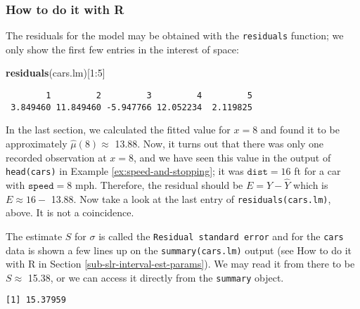 \documentclass[]{book}
\newenvironment{Shaded}{\begin{snugshade}}{\end{snugshade}}
\newcommand{\KeywordTok}[1]{\textcolor[rgb]{0.13,0.29,0.53}{\textbf{{#1}}}}
\newcommand{\DecValTok}[1]{\textcolor[rgb]{0.00,0.00,0.81}{{#1}}}
\newcommand{\StringTok}[1]{\textcolor[rgb]{0.31,0.60,0.02}{{#1}}}
\newcommand{\NormalTok}[1]{{#1}}
\numberwithin{equation}{chapter}
\numberwithin{figure}{chapter}
\theoremstyle{plain}
\theoremstyle{definition}
\theoremstyle{remark}
\theoremstyle{definition}
\theoremstyle{definition}
\theoremstyle{remark}
\begin{document}
\subsubsection{How to do it with R}\label{how-to-do-it-with-r-41}

The residuals for the model may be obtained with the \texttt{residuals}
function; we only show the first few entries in the interest of space:

\begin{Shaded}
\begin{Highlighting}[]
\KeywordTok{residuals}\NormalTok{(cars.lm)[}\DecValTok{1}\NormalTok{:}\DecValTok{5}\NormalTok{]}
\end{Highlighting}
\end{Shaded}

\begin{verbatim}
        1         2         3         4         5 
 3.849460 11.849460 -5.947766 12.052234  2.119825 
\end{verbatim}

In the last section, we calculated the fitted value for \(x=8\) and
found it to be approximately \(\hat{\mu}(8) \approx\) 13.88. Now, it
turns out that there was only one recorded observation at \(x = 8\), and
we have seen this value in the output of \texttt{head(cars)} in Example
\ref{ex:speed-and-stopping}; it was \(\mathtt{dist} = 16\) ft for a car
with \(\mathtt{speed} = 8\) mph. Therefore, the residual should be
\(E = Y - \hat{Y}\) which is \(E \approx 16 -\) 13.88. Now take a look
at the last entry of \texttt{residuals(cars.lm)}, above. It is not a
coincidence.

The estimate \(S\) for \(\sigma\) is called the
\texttt{Residual\ standard\ error} and for the \texttt{cars} data is
shown a few lines up on the \texttt{summary(cars.lm)} output (see How to
do it with R in Section \ref{sub-slr-interval-est-params}). We may read
it from there to be \(S\approx\) 15.38, or we can access it directly
from the \texttt{summary} object.

\begin{Shaded}
\end{Shaded}

\begin{verbatim}
[1] 15.37959
\end{verbatim}
\end{document}
